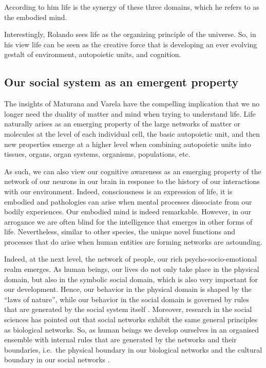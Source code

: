 \documentclass[
  11pt,
]{book}
\begin{document}
According to him life is the synergy of these three domains, which he refers to as the embodied mind.

Interestingly, Rolando sees life as the organizing principle of the universe. So, in his view life can be seen as the creative force that is developing an ever evolving gestalt of environment, autopoietic units, and cognition.

\pagebreak

\hypertarget{our-social-system-as-an-emergent-property}{%
\subsection{Our social system as an emergent property}\label{our-social-system-as-an-emergent-property}}

The insights of Maturana and Varela have the compelling implication that we no longer need the duality of matter and mind when trying to understand life. Life naturally arises as an emerging property of the large networks of matter or molecules at the level of each individual cell, the basic autopoietic unit, and then new properties emerge at a higher level when combining autopoietic units into tissues, organs, organ systems, organisms, populations, etc.

As such, we can also view our cognitive awareness as an emerging property of the network of our neurons in our brain in response to the history of our interactions with our environment. Indeed, consciousness is an expression of life, it is embodied and pathologies can arise when mental processes dissociate from our bodily experiences. Our embodied mind is indeed remarkable. However, in our arrogance we are often blind for the intelligence that emerges in other forms of life. Nevertheless, similar to other species, the unique novel functions and processes that do arise when human entities are forming networks are astounding.

Indeed, at the next level, the network of people, our rich psycho-socio-emotional realm emerges. As human beings, our lives do not only take place in the physical domain, but also in the symbolic social domain, which is also very important for our development. Hence, our behavior in the physical domain is shaped by the ``laws of nature'', while our behavior in the social domain is governed by rules that are generated by the social system itself \citep{capraLuisi2014}. Moreover, research in the social sciences has pointed out that social networks exhibit the same general principles as biological networks. So, as human beings we develop ourselves in an organised ensemble with internal rules that are generated by the networks and their boundaries, i.e.~the physical boundary in our biological networks and the cultural boundary in our social networks \citep{capraLuisi2014}.
\end{document}
